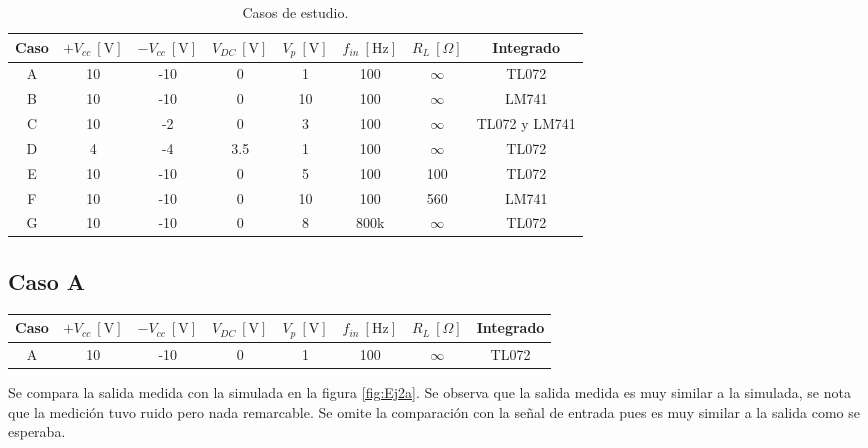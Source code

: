 \documentclass{article}
\begin{document}
\begin{table}[H]
\centering
\begin{tabular}{|c|c|c|c|c|c|c|c|}
\hline
Caso & $+V_{cc}\ [\text{V}]$ & $-V_{cc}\ [\text{V}]$ & $V_{DC}\ [\text{V}]$ & $V_p\ [\text{V}]$ & $f_{in}\ [\text{Hz}]$ & $R_L\ [\Omega]$ & Integrado \\ \hline
A & 10 & -10 & 0 & 1 & 100 & $\infty$ & TL072 \\ \hline
B & 10 & -10 & 0 & 10 & 100 & $\infty$ & LM741 \\ \hline
C & 10 & -2 & 0 & 3 & 100 & $\infty$ & TL072 y LM741 \\ \hline
D & 4 & -4 & 3.5 & 1 & 100 & $\infty$ & TL072 \\ \hline
E & 10 & -10 & 0 & 5 & 100 & 100 & TL072 \\ \hline
F & 10 & -10 & 0 & 10 & 100 & 560 & LM741 \\ \hline
G & 10 & -10 & 0 & 8 & 800k & $\infty$ & TL072 \\ \hline
\end{tabular}
\caption{Casos de estudio.}
\label{tab:Ej2}
\end{table}



\subsection{Caso A}

\begin{table}[H]
\centering
\begin{tabular}{|c|c|c|c|c|c|c|c|}
\hline
Caso & $+V_{cc}\ [\text{V}]$ & $-V_{cc}\ [\text{V}]$ & $V_{DC}\ [\text{V}]$ &
 $V_p\ [\text{V}]$ & $f_{in}\ [\text{Hz}]$ & $R_L\ [\Omega]$ & Integrado \\ \hline
A & 10 & -10 & 0 & 1 & 100 & $\infty$ & TL072 \\ \hline
\end{tabular}
\end{table}

Se compara la salida medida con la simulada en la figura \ref{fig:Ej2a}. 
Se observa que la salida medida es muy similar a la simulada, se nota que la medición tuvo ruido pero nada remarcable. 
Se omite la comparación con la señal de entrada pues es muy similar a la salida como se esperaba.
\end{document}
